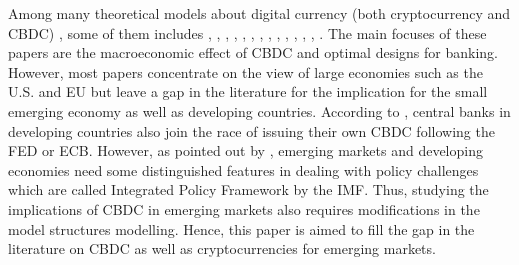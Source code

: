 \documentclass[12pt, a4paper]{article}
\begin{document}
Among many theoretical models about digital currency (both cryptocurrency and CBDC) , some of them includes \cite{auer2020technology}, \cite{auer2021cbdcs}, \cite{auer2021central}, \cite{agur2022designing}, \cite{schilling2019currency}, \cite{benigno2019monetary}, \cite{brunnermeier2019equivalence}, \cite{ikeda2020digital}, \cite{kumhof2021central}, \cite{minesso2022central}, \cite{kumhof2018central}, \cite{kumhof2021central}, \cite{engert2017central}, \cite{fernandez2021central}. The main focuses of these papers are the macroeconomic effect of CBDC and optimal designs for banking. However, most papers concentrate on the view of large economies such as the U.S. and EU but leave a gap in the literature for the implication for the small emerging economy as well as developing countries. According to \cite{chen2022cbdcs}, central banks in developing countries also join the race of issuing their own CBDC following the FED or ECB. However, as pointed out by \cite{imf2020toward}, emerging markets and developing economies need some distinguished features in dealing with policy challenges which are called Integrated Policy Framework by the IMF. Thus, studying the implications of CBDC in emerging markets also requires modifications in the model structures modelling. Hence, this paper is aimed to fill the gap in the literature on CBDC as well as cryptocurrencies for emerging markets.
\end{document}
